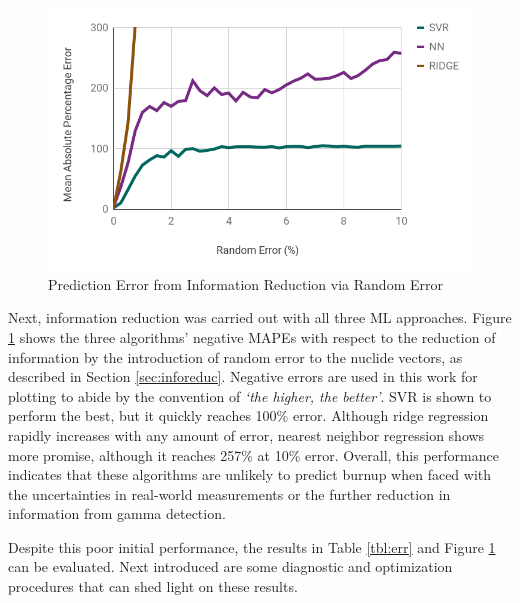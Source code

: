 \begin{figure}[!htb]
  \centering
  \includegraphics[width=\linewidth]{./chapters/demo_method/randerr.png}
  \caption{Prediction Error from Information Reduction via Random Error}
  \label{fig:randerr}
\end{figure}

Next, information reduction was carried out with all three \gls{ML} approaches.
Figure \ref{fig:randerr} shows the three algorithms' negative \glspl{MAPE} with
respect to the reduction of information by the introduction of random error to
the nuclide vectors, as described in Section \ref{sec:inforeduc}. Negative
errors are used in this work for plotting to abide by the convention of
\textit{`the higher, the better'}.  \gls{SVR} is shown to perform the best, but
it quickly reaches 100\% error. Although ridge regression rapidly increases
with any amount of error, nearest neighbor regression shows more promise,
although it reaches 257\% at 10\% error.  Overall, this performance indicates
that these algorithms are unlikely to predict burnup when faced with the
uncertainties in real-world measurements or the further reduction in
information from gamma detection.

Despite this poor initial performance, the results in Table \ref{tbl:err} and
Figure \ref{fig:randerr} can be evaluated. Next introduced are some diagnostic
and optimization procedures that can shed light on these results.
